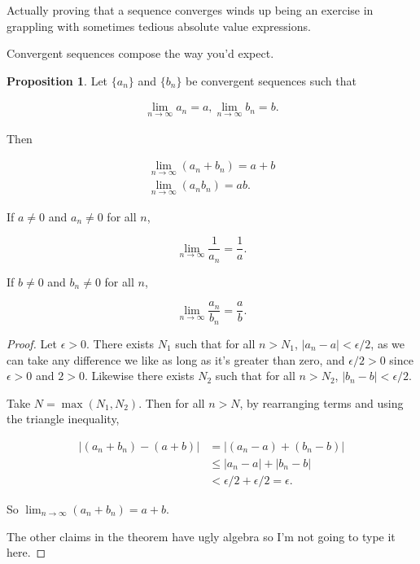 \documentclass{article}
\theoremstyle{definition}
\newtheorem{proposition}{Proposition}[section]
\begin{document}
Actually proving that a sequence converges winds up being an exercise in grappling with sometimes tedious
absolute value expressions.

Convergent sequences compose the way you'd expect.

\pagebreak

\begin{proposition}
Let $\{a_n\}$ and $\{b_n\}$ be convergent sequences such that

\begin{align}
\lim_{n \to \infty} a_n = a, \lim_{n \to \infty} b_n = b.
\end{align}

Then

\begin{align}
\lim_{n \to \infty} (a_n + b_n) = a + b \\
\lim_{n \to \infty} (a_n b_n) = ab.
\end{align}

If $a \neq 0$ and $a_n \neq 0$ for all $n$,

\begin{equation}
\lim_{n \to \infty} \frac{1}{a_n} = \frac{1}{a}.
\end{equation}

If $b \neq 0$ and $b_n \neq 0$ for all $n$,

\begin{equation}
\lim_{n \to \infty} \frac{a_n}{b_n} = \frac{a}{b}.
\end{equation}

\end{proposition}

\begin{proof}
Let $\epsilon > 0$. There exists $N_1$ such that for all $n > N_1$, $|a_n - a| < \epsilon/2$, as we can take any difference we like as long as it's greater than zero, and $\epsilon/2 > 0$ since $\epsilon > 0$ and $2 > 0$. Likewise there exists $N_2$ such that for all $n > N_2$, $|b_n - b| < \epsilon/2$.

Take $N = \max(N_1, N_2)$. Then for all $n > N$, by rearranging terms and using the triangle inequality,

\begin{align}
|(a_n + b_n) - (a+b)| & =  |(a_n - a) + (b_n - b)| \\
& \leq  |a_n - a| + |b_n - b| \\
& <  \epsilon/2 + \epsilon/2 = \epsilon.
\end{align}

So $\lim_{n \to \infty} (a_n + b_n) = a + b$.

The other claims in the theorem have ugly algebra so I'm not going to type it here.
\end{proof}
\end{document}
